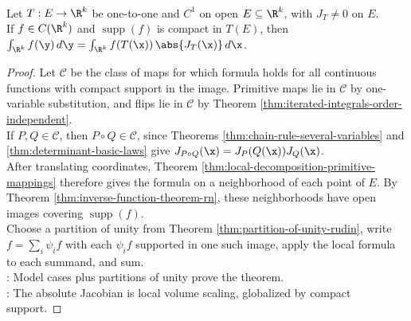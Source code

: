 \begin{theorem} \label{thm:change-of-variables-rk}\label{thm:multiple-integration-main-source-todo} \\
Let $T:E\to\R^k$ be one-to-one and $C^1$ on open $E\subseteq\R^k$, with $J_T\neq0$ on $E$.\\
If $f\in C(\R^k)$ and $\operatorname{supp}(f)$ is compact in $T(E)$, then $\int_{\R^k}f(\y)\,d\y = \int_{\R^k}f(T(\x))\,\abs{J_T(\x)}\,d\x$.
\begin{proof}
Let $\mathcal{C}$ be the class of maps for which formula holds for all continuous functions with compact support in the image. Primitive maps lie in $\mathcal{C}$ by one-variable substitution, and flips lie in $\mathcal{C}$ by Theorem \ref{thm:iterated-integrals-order-independent}.\\
If $P,Q\in\mathcal{C}$, then $P\circ Q\in\mathcal{C}$, since Theorems \ref{thm:chain-rule-several-variables} and \ref{thm:determinant-basic-laws} give $J_{P\circ Q}(\x)=J_P(Q(\x))J_Q(\x)$.\\
After translating coordinates, Theorem \ref{thm:local-decomposition-primitive-mappings} therefore gives the formula on a neighborhood of each point of $E$. By Theorem \ref{thm:inverse-function-theorem-rn}, these neighborhoods have open images covering $\operatorname{supp}(f)$.\\
Choose a partition of unity from Theorem \ref{thm:partition-of-unity-rudin}, write $f=\sum_i\psi_i f$ with each $\psi_i f$ supported in one such image, apply the local formula to each summand, and sum.\\
: Model cases plus partitions of unity prove the theorem.\\
: The absolute Jacobian is local volume scaling, globalized by compact support.
\end{proof}
\end{theorem}

